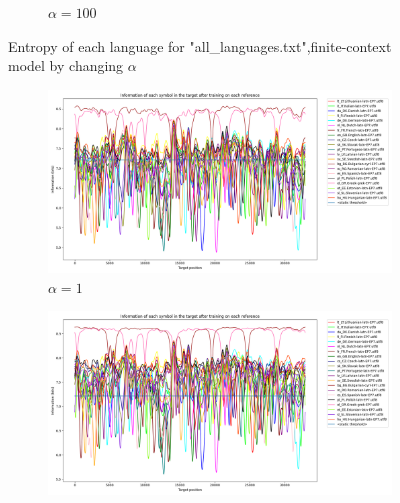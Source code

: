 \documentclass{article}
\begin{document}
\begin{figure}
\begin{subfigure}[b]{0.3\textwidth}
\begin{center}
        \end{center}
        \caption{$\alpha = 100$}
        \label{fig:all_languages_p_c:100:3}
    \end{subfigure}
    
    \caption{Entropy of each language for "all_languages.txt",finite-context model by changing $\alpha$}
    \label{fig:all_languages_p_c:alpha}
\end{figure}

\begin{figure}
    \begin{subfigure}[b]{0.3\textwidth}
        \begin{center}
            \includegraphics[width=1.0\linewidth]{../results/all_languages_random/-p_c:1:3.png}
        \end{center}
        \caption{$\alpha = 1$}
        \label{fig:all_languages_random_p_c:1:3_again}
    \end{subfigure}
    \hfill
    \begin{subfigure}[b]{0.3\textwidth}
        \begin{center}
            \includegraphics[width=1.0\linewidth]{../results/all_languages_random/-p_c:10:3.png}

\end{center}
\end{subfigure}
\end{figure}
\end{document}
